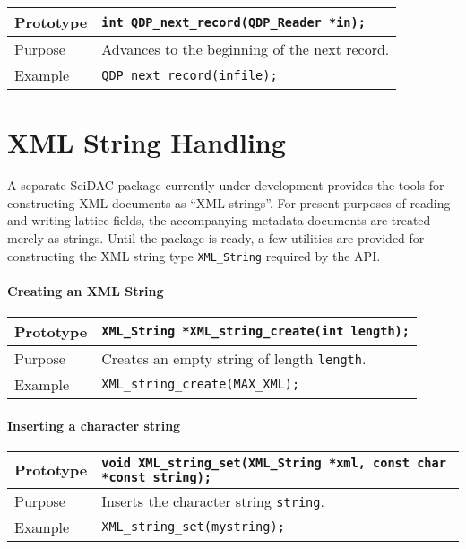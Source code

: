 \documentclass{article}
\begin{document}
\begin{flushleft}
  \begin{tabular}{|l|l|}
  \hline
  Prototype      & \verb|int QDP_next_record(QDP_Reader *in);|\\
    \hline
  Purpose        & Advances to the beginning of the next record. \\
   \hline
  Example  & \verb|QDP_next_record(infile);| \\
   \hline
 \end{tabular}
\end{flushleft}
%

\section{XML String Handling}

A separate SciDAC package currently under development provides the
tools for constructing XML documents as ``XML strings''.  For present
purposes of reading and writing lattice fields, the accompanying
metadata documents are treated merely as strings.  Until the package
is ready, a few utilities are provided for constructing the XML string
type \verb|XML_String| required by the API\@.

\paragraph{Creating an XML String}

\begin{flushleft}
  \begin{tabular}{|l|l|}
  \hline
  Prototype      & \verb|XML_String *XML_string_create(int length);|\\
    \hline
  Purpose        & Creates an empty string of length \verb|length|. \\
   \hline
  Example        & \verb|XML_string_create(MAX_XML);| \\
   \hline
 \end{tabular}
\end{flushleft}
%
\paragraph{Inserting a character string}

\begin{flushleft}
  \begin{tabular}{|l|l|}
  \hline
  Prototype      & \verb|void XML_string_set(XML_String *xml, const char *const string);|\\
    \hline
  Purpose        & Inserts the character string \verb|string|. \\
   \hline
  Example        & \verb|XML_string_set(mystring);| \\
   \hline
 \end{tabular}
\end{flushleft}
%
\end{document}
